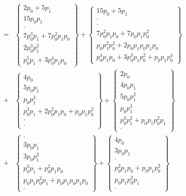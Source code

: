 \documentclass[a4paper,12pt]{article}
\numberwithin{definition}{section}
\numberwithin{lemma}{section}
\numberwithin{proposition}{section}
\numberwithin{theorem}{section}
\numberwithin{grammar}{section}
\numberwithin{program}{section}
\numberwithin{convention}{section}
\numberwithin{corollary}{section}
\numberwithin{principle}{section}
\begin{document}
$$\begin{array}{lcl}
    & = & \begin{Bmatrix} 2 p_0 + 5 p_1 \\ 15 p_0 p_1 \\ \cdot \\ 7 p_0^3 p_1 + 7 p_0^2 p_1 p_0 \\ 2 p_0^3 p_1^2 \\ p_0^5 p_1 + 3 p_0^4 p_1 p_0 \end{Bmatrix} +
          \begin{Bmatrix} 15 p_0 + 5 p_1  \\ \cdot \\ \cdot \\ 7 p_0^2 p_1 p_0 + 7 p_0 p_1 p_0^2 \\ p_0 p_1^2 p_0^2 + 2 p_0 p_1 p_0 p_1 p_0 \\ p_0^4 p_1 p_0 + 3 p_0^3 p_1 p_0^2 + p_0 p_1 p_0^4 \end{Bmatrix} \\
    & + & \begin{Bmatrix} 4 p_0 \\ 5 p_0 p_1 \\ p_0 p_1^2 \\ p_0^3 p_1 + 2 p_0^2 p_1 p_0 + p_0 p_1 p_0^2 \\ \cdot \\ \cdot \end{Bmatrix} +
          \begin{Bmatrix} 2 p_0 \\ 4 p_0 p_1 \\ 5 p_0 p_1^2 \\ p_0 p_1^3 \\ p_0^3 p_1^2 + p_0 p_1 p_0^2 p_1 \\ \cdot \end{Bmatrix} \\
    & + & \begin{Bmatrix} \cdot \\ 3 p_0 p_1 \\ 3 p_0 p_1^2 \\ p_0^3 p_1 + p_0^2 p_1 p_0 \\ p_0 p_1 p_0^2 p_1 + p_0 p_1 p_0 p_1 p_0 \\ \cdot \end{Bmatrix} +
          \begin{Bmatrix} 4 p_0 \\ 3 p_0 p_1 \\ \cdot \\ p_0^2 p_1 p_0 + p_0 p_1 p_0^2 \\ p_0 p_1 p_0^2 p_1 \\ \cdot  \end{Bmatrix} \\

\end{array}$$
\end{document}
